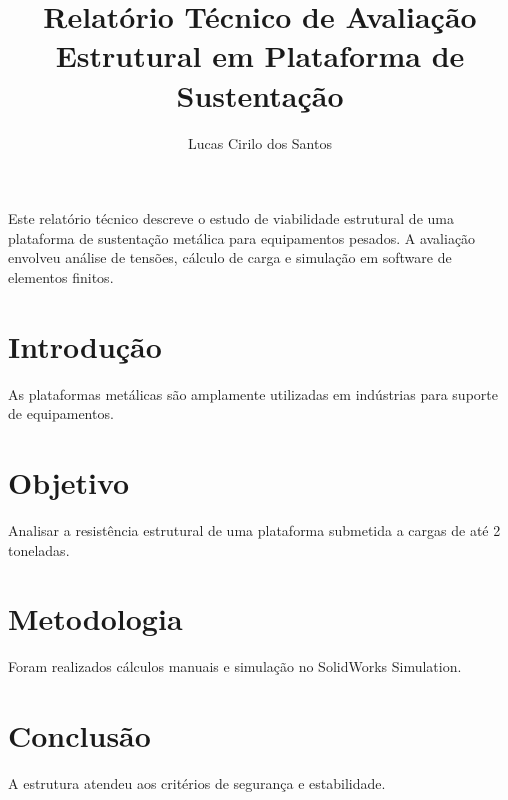 \documentclass{abnt2025}
\title{Relatório Técnico de Avaliação Estrutural em Plataforma de Sustentação}
\author{Lucas Cirilo dos Santos}
\begin{document}
\maketitle

\begin{resumo}
Este relatório técnico descreve o estudo de viabilidade estrutural de uma plataforma de sustentação metálica para equipamentos pesados. A avaliação envolveu análise de tensões, cálculo de carga e simulação em software de elementos finitos.
\end{resumo}


\section{Introdução}
As plataformas metálicas são amplamente utilizadas em indústrias para suporte de equipamentos.

\section{Objetivo}
Analisar a resistência estrutural de uma plataforma submetida a cargas de até 2 toneladas.

\section{Metodologia}
Foram realizados cálculos manuais e simulação no SolidWorks Simulation.

\section{Conclusão}
A estrutura atendeu aos critérios de segurança e estabilidade.



\end{document}
